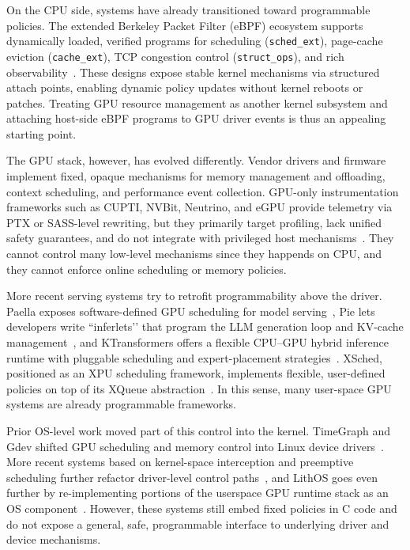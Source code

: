 On the CPU side, systems have already transitioned toward programmable policies. The extended Berkeley Packet Filter (eBPF) ecosystem supports dynamically loaded, verified programs for scheduling (\texttt{sched\_ext}), page-cache eviction (\texttt{cache\_ext}), TCP congestion control (\texttt{struct\_ops}), and rich observability~\cite{gregg16,gregg2021computing,Bachl21,Zhong22,jia2023programmable,schedext-docs,cacheext-docs}. These designs expose stable kernel mechanisms via structured attach points, enabling dynamic policy updates without kernel reboots or patches. Treating GPU resource management as another kernel subsystem and attaching host-side eBPF programs to GPU driver events is thus an appealing starting point.

The GPU stack, however, has evolved differently. Vendor drivers and firmware implement fixed, opaque mechanisms for memory management and offloading, context scheduling, and performance event collection. GPU-only instrumentation frameworks such as CUPTI, NVBit, Neutrino, and eGPU provide telemetry via PTX or SASS-level rewriting, but they primarily target profiling, lack unified safety guarantees, and do not integrate with privileged host mechanisms~\cite{cupti,villa2019nvbit,neutrino,egpu}. They cannot control many low-level mechanisms since they happends on CPU, and they cannot enforce online scheduling or memory policies.

More recent serving systems try to retrofit programmability above the driver. Paella exposes software-defined GPU scheduling for model serving~\cite{paella}, Pie lets developers write “inferlets’’ that program the LLM generation loop and KV-cache management~\cite{pie}, and KTransformers offers a flexible CPU–GPU hybrid inference runtime with pluggable scheduling and expert-placement strategies~\cite{ktransformers}. XSched, positioned as an XPU scheduling framework, implements flexible, user-defined policies on top of its XQueue abstraction~\cite{xsched}. In this sense, many user-space GPU systems are already programmable frameworks.

Prior OS-level work moved part of this control into the kernel. TimeGraph and Gdev shifted GPU scheduling and memory control into Linux device drivers~\cite{timegraph,gdev}. More recent systems based on kernel-space interception and preemptive scheduling further refactor driver-level control paths~\cite{kernelintercept,gpreempt}, and LithOS goes even further by re-implementing portions of the userspace GPU runtime stack as an OS component~\cite{lithos}. However, these systems still embed fixed policies in C code and do not expose a general, safe, programmable interface to underlying driver and device mechanisms.

